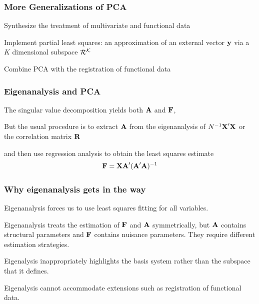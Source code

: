 \documentclass[11pt]{beamer}
\begin{document}
\begin{frame}

\frametitle{More Generalizations of PCA}

\bi
  \item Synthesize the treatment of multivariate and functional data
  \item Implement partial least squares: an approximation of an external vector $\mbox{\bf y}$ via a $K$ dimensional subspace $\cal{R}^K$
  \item Combine PCA with the registration of functional data
\ei

\end{frame}


\begin{frame}

\frametitle{Eigenanalysis and PCA}

\bi
  \item The singular value decomposition yields both $\mbox{\bf A}$ and $\mbox{\bf F}$,
  \item But the usual procedure is to extract $\mbox{\bf A}$ from the eigenanalysis of $N^{-1} \mbox{\bf X}' \mbox{\bf X}$
  or the correlation matrix $\mbox{\bf R}$
  \item and then use regression analysis to obtain the least squares estimate
  \[
    \mbox{\bf F} = \mbox{\bf X} \mbox{\bf A}' (\mbox{\bf A}' \mbox{\bf A})^{-1}
  \]
\ei

\end{frame}


\begin{frame}

\frametitle{Why eigenanalysis gets in the way}

\bi
  \item Eigenanalysis forces us to use least squares fitting for all variables.
  \item Eigenanalysis treats the estimation of $\mbox{\bf F}$ and $\mbox{\bf A}$ symmetrically, but $\mbox{\bf A}$ contains structural parameters and $\mbox{\bf F}$ contains nuisance parameters.  They require different estimation strategies.
  \item Eigenalysis inappropriately highlights the basis system rather than the subspace that it defines.
  \item Eigenalysis cannot accommodate extensions such as registration of functional data.
\ei

\end{frame}
\end{document}

